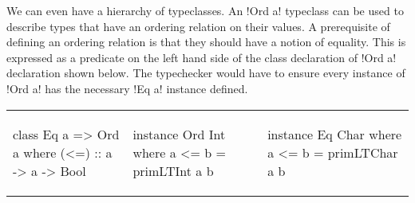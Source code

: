 \documentclass[format=acmsmall,manuscript,review,screen,nonacm,margin=1in,11pt]{acmart}
\begin{document}
We can even have a hierarchy of typeclasses. An !Ord a! typeclass can be used to describe
types that have an ordering relation on their values. A prerequisite of defining an ordering relation
is that they should have a notion of equality. This is expressed as a predicate on the left hand side
of the class declaration of !Ord a! declaration shown below. The typechecker would
have to ensure every instance of !Ord a! has the necessary !Eq a! instance defined.\newline
{    \footnotesize
  \begin{tabular}{l l l}
\begin{code}
class Eq a => Ord a where
  (<=) :: a -> a -> Bool
\end{code}&%
\begin{code}
instance Ord Int where
  a <= b = primLTInt a b
\end{code}&%
\begin{code}
instance Eq Char where
  a <= b = primLTChar a b
\end{code}
\end{tabular}}
\end{document}
